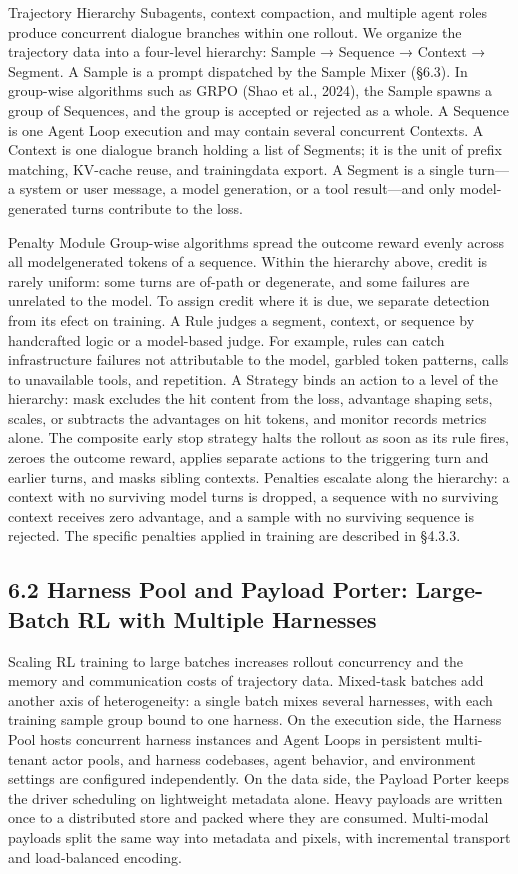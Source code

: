 \documentclass[
  10
]{article}
\begin{document}
Trajectory Hierarchy Subagents, context compaction, and multiple agent
roles produce concurrent dialogue branches within one rollout. We
organize the trajectory data into a four-level hierarchy: Sample →
Sequence → Context → Segment. A Sample is a prompt dispatched by the
Sample Mixer (§6.3). In group-wise algorithms such as GRPO (Shao et al.,
2024), the Sample spawns a group of Sequences, and the group is accepted
or rejected as a whole. A Sequence is one Agent Loop execution and may
contain several concurrent Contexts. A Context is one dialogue branch
holding a list of Segments; it is the unit of prefix matching, KV-cache
reuse, and trainingdata export. A Segment is a single turn---a system or
user message, a model generation, or a tool result---and only
model-generated turns contribute to the loss.

Penalty Module Group-wise algorithms spread the outcome reward evenly
across all modelgenerated tokens of a sequence. Within the hierarchy
above, credit is rarely uniform: some turns are of-path or degenerate,
and some failures are unrelated to the model. To assign credit where it
is due, we separate detection from its efect on training. A Rule judges
a segment, context, or sequence by handcrafted logic or a model-based
judge. For example, rules can catch infrastructure failures not
attributable to the model, garbled token patterns, calls to unavailable
tools, and repetition. A Strategy binds an action to a level of the
hierarchy: mask excludes the hit content from the loss, advantage
shaping sets, scales, or subtracts the advantages on hit tokens, and
monitor records metrics alone. The composite early stop strategy halts
the rollout as soon as its rule fires, zeroes the outcome reward,
applies separate actions to the triggering turn and earlier turns, and
masks sibling contexts. Penalties escalate along the hierarchy: a
context with no surviving model turns is dropped, a sequence with no
surviving context receives zero advantage, and a sample with no
surviving sequence is rejected. The specific penalties applied in
training are described in §4.3.3.

\subsection{6.2 Harness Pool and Payload Porter: Large-Batch RL with
Multiple
Harnesses}\label{harness-pool-and-payload-porter-large-batch-rl-with-multiple-harnesses}

Scaling RL training to large batches increases rollout concurrency and
the memory and communication costs of trajectory data. Mixed-task
batches add another axis of heterogeneity: a single batch mixes several
harnesses, with each training sample group bound to one harness. On the
execution side, the Harness Pool hosts concurrent harness instances and
Agent Loops in persistent multi-tenant actor pools, and harness
codebases, agent behavior, and environment settings are configured
independently. On the data side, the Payload Porter keeps the driver
scheduling on lightweight metadata alone. Heavy payloads are written
once to a distributed store and packed where they are consumed.
Multi-modal payloads split the same way into metadata and pixels, with
incremental transport and load-balanced encoding.
\end{document}
